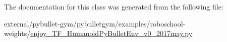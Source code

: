 The documentation for this class was generated from the following file\+:\begin{DoxyCompactItemize}
\item 
external/pybullet-\/gym/pybulletgym/examples/roboschool-\/weights/\hyperlink{enjoy___t_f___humanoid_py_bullet_env__v0__2017may_8py}{enjoy\+\_\+\+T\+F\+\_\+\+Humanoid\+Py\+Bullet\+Env\+\_\+v0\+\_\+2017may.\+py}\end{DoxyCompactItemize}
